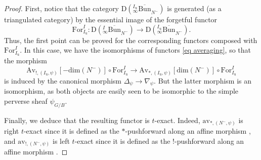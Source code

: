 \documentclass[11pt]{amsart}
\theoremstyle{plain}
\theoremstyle{remark}
\numberwithin{equation}{section}
\begin{document}
 \begin{proof}
     First, notice that the category $\mathrm{D}({_{ \infty}^{I_\mathrm{u}}\overline{\mathrm{Bun}}}_{N^-})$ is generated (as a triangulated category) by the essential image of the forgetful functor 
     $$\mathrm{For}^I_{I_\mathrm{u}}:\mathrm{D}({_{ \infty}^{I}\overline{\mathrm{Bun}}}_{N^-})\to \mathrm{D}({_{ \infty}^{I_\mathrm{u}}\overline{\mathrm{Bun}}}_{N^-}).$$
   Thus, the first point can be proved for the corresponding functors composed with $\mathrm{For}^I_{I_\mathrm{u}}$. In this case, we have the isomorphisms of functors \eqref{eq averaging}, so that the morphism 
     $$\mathrm{Av}_{!,(I_\mathrm{u},\psi)}[-\mathrm{dim}(N^-)]\circ\mathrm{For}^I_{I_\mathrm{u}}\to \mathrm{Av}_{*,(I_\mathrm{u},\psi)}[\mathrm{dim}(N^-)]\circ\mathrm{For}^I_{I_\mathrm{u}} $$
     is induced by the canonical morphism $\Delta_\psi\to\nabla_\psi$. But the latter morphism is an isomorphism, as both objects are easily seen to be isomorphic to the simple perverse sheaf $\psi_{G/B}$.

     Finally, we deduce that the resulting functor is $t$-exact. Indeed, $\mathrm{av}_{*,(N^-,\psi)}$ is right $t$-exact since it is defined as the $*$-pushforward along an affine morphism \cite[Th\'eor\`eme 4.1.1]{beilinson2018faisceaux}, and $\mathrm{av}_{!,(N^-,\psi)}$ is left $t$-exact since it is defined as the $!$-pushforward along an affine morphism \cite[Corollaire 4.1.2]{beilinson2018faisceaux}.
 \end{proof}
	
\end{document}
